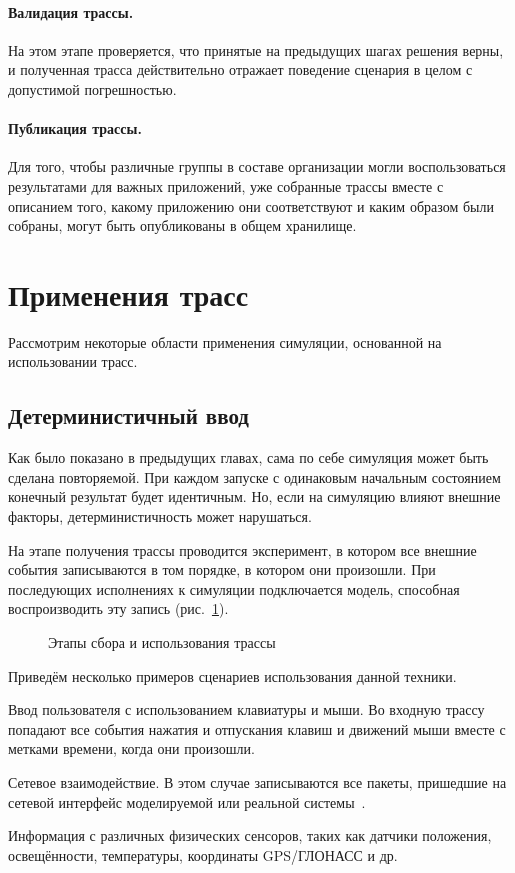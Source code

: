 \paragraph{Валидация трассы.} На этом этапе проверяется, что принятые на предыдущих шагах решения верны, и полученная трасса действительно отражает поведение сценария в целом с допустимой погрешностью.

\paragraph{Публикация трассы.} Для того, чтобы различные группы в составе организации могли воспользоваться результатами для важных приложений, уже собранные трассы вместе с описанием того, какому приложению они соответствуют и каким образом были собраны, могут быть опубликованы в общем хранилище.

\section{Применения трасс}

Рассмотрим некоторые области применения симуляции, основанной на использовании трасс.

\subsection{Детерминистичный ввод}

Как было показано в предыдущих главах, сама по себе симуляция может быть сделана повторяемой. При каждом запуске с одинаковым начальным состоянием конечный результат будет идентичным. Но, если на симуляцию влияют внешние факторы, детерминистичность может нарушаться.

На этапе получения трассы проводится эксперимент, в котором все внешние события записываются в том порядке, в котором они произошли. При последующих исполнениях к симуляции подключается модель, способная воспроизводить эту запись (рис.~\ref{fig:trace-collection}).

\begin{figure}[htp]
    \centering
    \caption[Этапы сбора и использования трассы]{Этапы сбора и использования трассы}
    \label{fig:trace-collection}
\end{figure}

Приведём несколько примеров сценариев использования данной техники.
\begin{itemize*}
    \item Ввод пользователя с использованием клавиатуры и мыши. Во входную трассу попадают все события нажатия и отпускания клавиш и движений мыши вместе с метками времени, когда они произошли.
    \item Сетевое взаимодействие. В этом случае записываются все пакеты, пришедшие на сетевой интерфейс моделируемой или реальной системы~\cite{network-simulation}.
    \item Информация с различных физических сенсоров, таких как датчики положения, освещённости, температуры, координаты GPS/ГЛОНАСС и др.
\end{itemize*}

